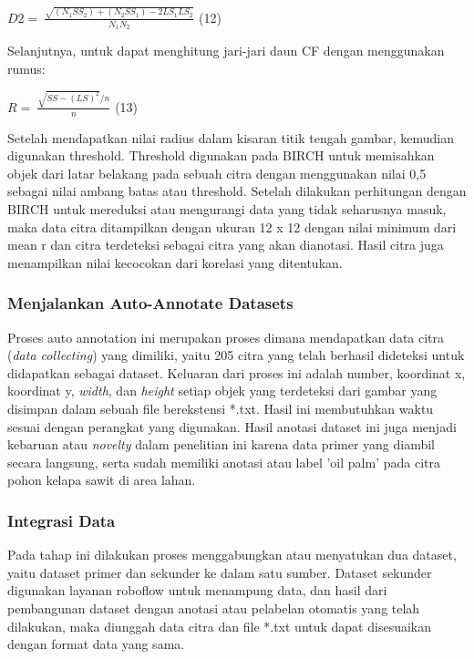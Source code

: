 $D2=\ \frac{\sqrt{\left(N_1{SS}_2\right)+\left(N_2{SS}_1\right)-2{LS}_1{LS}_2}}{N_1N_2}$ \hfill (12)

Selanjutnya, untuk dapat menghitung jari-jari daun CF dengan menggunakan rumus:

$R=\ \frac{\sqrt{SS-{(LS)}^2}/n}{n}$ \hfill (13)

Setelah mendapatkan nilai radius dalam kisaran titik tengah gambar, kemudian digunakan threshold. Threshold digunakan pada BIRCH untuk memisahkan objek dari latar belakang pada sebuah citra dengan menggunakan nilai 0,5 sebagai nilai ambang batas atau threshold. Setelah dilakukan perhitungan dengan BIRCH untuk mereduksi atau mengurangi data yang tidak seharusnya masuk, maka data citra ditampilkan dengan ukuran 12 x 12 dengan nilai minimum dari mean r dan citra terdeteksi sebagai citra yang akan dianotasi. Hasil citra juga menampilkan nilai kecocokan dari korelasi yang ditentukan.

\subsubsection{Menjalankan Auto-Annotate Datasets}
\hspace{1,2cm}Proses auto annotation ini merupakan proses dimana mendapatkan data citra (\textit{data collecting}) yang dimiliki, yaitu 205 citra yang telah berhasil dideteksi untuk didapatkan sebagai dataset. Keluaran dari proses ini adalah number, koordinat x, koordinat y, \textit{width}, dan \textit{height} setiap objek yang terdeteksi dari gambar yang disimpan dalam sebuah file berekstensi *.txt. Hasil ini membutuhkan waktu sesuai dengan perangkat yang digunakan. Hasil anotasi dataset ini juga menjadi kebaruan atau \textit{novelty} dalam penelitian ini karena data primer yang diambil secara langsung, serta sudah memiliki anotasi atau label 'oil palm' pada citra pohon kelapa sawit di area lahan. 

\subsubsection{Integrasi Data}
\hspace{1,2cm}Pada tahap ini dilakukan proses menggabungkan atau menyatukan dua dataset, yaitu dataset primer dan sekunder ke dalam satu sumber. Dataset sekunder digunakan layanan roboflow untuk menampung data, dan hasil dari pembangunan dataset dengan anotasi atau pelabelan otomatis yang telah dilakukan, maka diunggah data citra dan file *.txt untuk dapat disesuaikan dengan format data yang sama.


